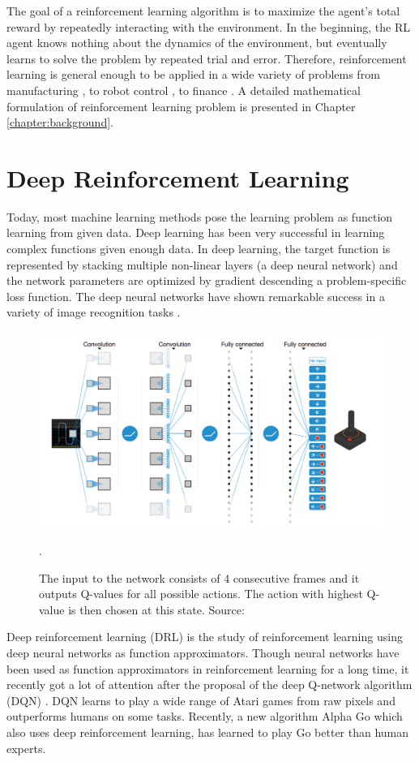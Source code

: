 The goal of a reinforcement learning algorithm is to maximize the agent's total reward by repeatedly interacting with the environment. In the beginning, the RL agent knows nothing about the dynamics of the environment, but eventually learns to solve the problem by repeated trial and error. Therefore, reinforcement learning is general enough to be applied in a wide variety of problems from manufacturing \cite{01_manu}, to robot control \cite{01_control}, to finance \cite{01_finance}.  A detailed mathematical formulation of reinforcement learning problem is presented in Chapter \ref{chapter:background}.

\section{Deep Reinforcement Learning}
Today, most machine learning methods pose the learning problem as function learning from given data. Deep learning has been very successful in learning complex functions given enough data. In deep learning, the target function is represented by stacking multiple non-linear layers (a deep neural network) and the network parameters are optimized by gradient descending a problem-specific loss function. The deep neural networks have shown remarkable success in a variety of image recognition tasks \cite{01_imagenet}. 

\begin{figure}[htb]
    \centering
    \includegraphics[width=.9\linewidth]{figures/01/dqn.png}
    \caption{The input to the network consists of 4 consecutive frames and it outputs Q-values for all possible actions. The action with highest Q-value is then chosen at this state. Source: \cite{mnih2015humanlevel}}.
    \label{fig:01_dqn}
\end{figure}

Deep reinforcement learning (DRL) is the study of reinforcement learning using deep neural networks as function approximators. Though neural networks have been used as function approximators in reinforcement learning for a long time, it recently got a lot of attention after the proposal of the deep Q-network algorithm (DQN) \cite{01_dqn}. DQN learns to play a wide range of Atari games from raw pixels and outperforms humans on some tasks. Recently, a new algorithm Alpha Go \cite{01_alphago} which also uses deep reinforcement learning, has learned to play Go better than human experts. 

